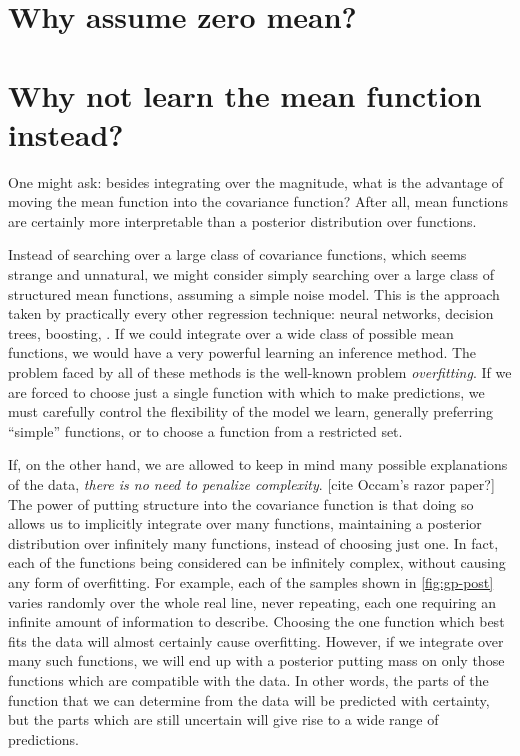 \outbpdocument{


}




\iffalse
\section{Why assume zero mean?}

\section{Why not learn the mean function instead?}
One might ask: besides integrating over the magnitude, what is the advantage of moving the mean function into the covariance function?
After all, mean functions are certainly more interpretable than a posterior distribution over functions.

Instead of searching over a large class of covariance functions, which seems strange and unnatural, we might consider simply searching over a large class of structured mean functions, assuming a simple \iid noise model.
This is the approach taken by practically every other regression technique: neural networks, decision trees, boosting, \etc.
If we could integrate over a wide class of possible mean functions, we would have a very powerful learning an inference method.
The problem faced by all of these methods is the well-known problem \emph{overfitting}.
If we are forced to choose just a single function with which to make predictions, we must carefully control the flexibility of the model we learn, generally preferring ``simple'' functions, or to choose a function from a restricted set.

If, on the other hand, we are allowed to keep in mind many possible explanations of the data, \emph{there is no need to penalize complexity}. [cite Occam's razor paper?]
The power of putting structure into the covariance function is that doing so allows us to implicitly integrate over many functions, maintaining a posterior distribution over infinitely many functions, instead of choosing just one.
In fact, each of the functions being considered can be infinitely complex, without causing any form of overfitting.
For example, each of the samples shown in \cref{fig:gp-post} varies randomly over the whole real line, never repeating, each one requiring an infinite amount of information to describe.
Choosing the one function which best fits the data will almost certainly cause overfitting.
However, if we integrate over many such functions, we will end up with a posterior putting mass on only those functions which are compatible with the data.
In other words, the parts of the function that we can determine from the data will be predicted with certainty, but the parts which are still uncertain will give rise to a wide range of predictions.

